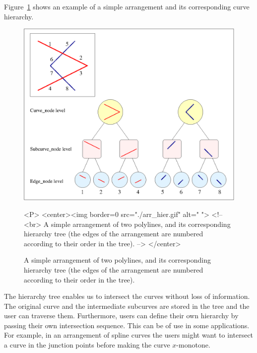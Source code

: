 Figure~\ref{fig:hierarchy} shows an example of a simple arrangement and its 
corresponding curve hierarchy.


\begin{figure}
\begin{ccTexOnly}
{\centerline {\includegraphics{arr_hier.ps}}}
\end{ccTexOnly}
\caption{A simple arrangement of two polylines, and its corresponding
hierarchy tree (the edges of the arrangement are numbered according to
their order in the tree).\label{fig:hierarchy}}
\begin{ccHtmlOnly}
<P>
<center><img border=0 src="./arr_hier.gif" alt=" ">
<!--
<br>
A simple arrangement of two polylines, and its corresponding hierarchy tree
(the edges of the arrangement are numbered according to their order
in the tree).
-->
</center>
\end{ccHtmlOnly}
\end{figure}

The hierarchy tree enables us to intersect the curves without loss of
information. The original curve and the intermediate subcurves are stored
in the tree and the user can traverse them. Furthermore, users can
define their own hierarchy by passing their own intersection sequence.
This can be of use in some applications. For example, in an arrangement
of spline curves the users might want to intersect a curve in the
junction points before making the curve $x$-monotone. 

